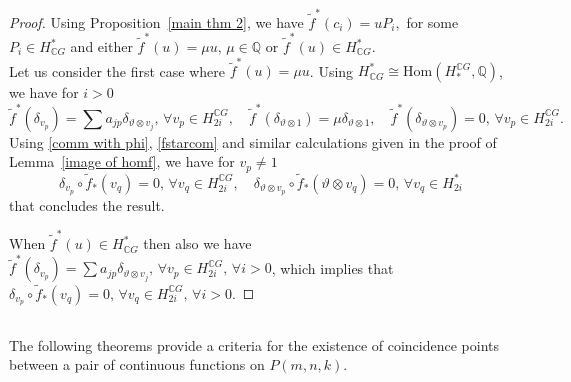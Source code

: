 \documentclass{amsart}
\newcommand{\lemref}[1]{Lemma~\ref{#1}}
\newcommand{\propref}[1]{Proposition~\ref{#1}}
\renewcommand{\hom}{\mathrm{Hom}}
\begin{document}
	\begin{proof}
		Using %
\propref{main thm 2}, we have $\tilde{f}^*(c_i) = u P_i,$ for some $P_i\in H^*_{\mathbb{C}G}$ and either $\tilde{f}^*(u) = \mu u,\, \mu \in \mathbb{Q}$ or $\tilde{f}^*(u)\in H^*_{\mathbb{C}G}$. \\
		Let us consider the first case where $\tilde{f}^*(u) = \mu u$. Using $H^*_{\mathbb{C}G}\cong \hom(H_*^{\mathbb{C}G},\mathbb{Q})$, we have for %
$i>0$ 
		\begin{equation}\label{fstarcom}
			\tilde{f}^*(\delta_{v_p}) = \sum a_{jp}\delta_{\vartheta \otimes v_j} , \, \forall v_{p}\in H_{2i}^{\mathbb{C}G}, \quad \tilde{f}^*(\delta_{\vartheta\otimes 1})  =\mu \delta_{\vartheta \otimes 1}, \quad \tilde{f}^*(\delta_{\vartheta\otimes v_{p}})  = 0, \, \forall v_{p}\in H_{2i}^{\mathbb{C}G}.
		\end{equation}
		Using %
\eqref{comm with phi}, \eqref{fstarcom} and similar calculations given in the proof of \lemref{image of homf}, we have for $ v_p\neq 1$
		$$\delta_{v_p}\circ \tilde{f}_*(v_q) = 0,\, \forall v_q \in H_{2i}^{\mathbb{C}G},\quad \delta_{\vartheta\otimes v_p}\circ \tilde{f}_*(\vartheta\otimes v_q) =0,\, \forall v_q \in H_{2i}^{*}$$ that concludes the result.
		
		When $\tilde{f}^*(u)\in H^*_{\mathbb{C}G}$ then also we %
have $\tilde{f}^*(\delta_{v_p}) = \sum a_{jp}\delta_{\vartheta \otimes v_j} , \, \forall v_{p}\in H_{2i}^{\mathbb{C}G},\, \forall i>0$, which %
implies that %
$\delta_{v_p}\circ \tilde{f}_*(v_q) = 0,\, \forall v_q \in H_{2i}^{\mathbb{C}G},\,\forall i>0.$   		
	\end{proof}


\subsection{} The following theorems provide %
a criteria for the existence of coincidence points between a pair of continuous functions on $P(m,n,k)$.
\end{document}
